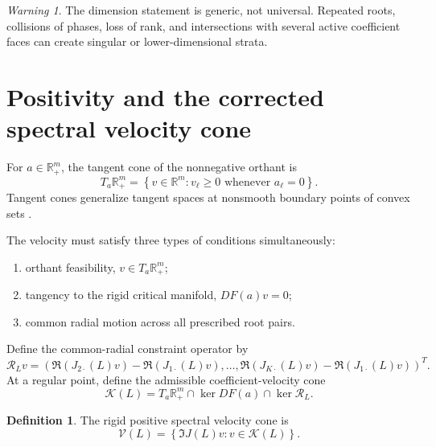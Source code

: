 \documentclass[11pt]{amsart}
\numberwithin{equation}{section}
\theoremstyle{plain}
\theoremstyle{definition}
\newtheorem{definition}[theorem]{Definition}
\theoremstyle{remark}
\newtheorem{warning}[theorem]{Warning}
\begin{document}
\begin{warning}
\label{warn:singular_manifold}
The dimension statement is generic, not universal.  Repeated roots, collisions of phases, loss of rank, and intersections with several active coefficient faces can create singular or lower-dimensional strata.
\end{warning}

\section{Positivity and the corrected spectral velocity cone}
\label{sec:velocity_cone}

For $a\in\mathbb R_+^m$, the tangent cone of the nonnegative orthant is
\begin{equation}
T_a\mathbb R_+^m
=
\left\{
v\in\mathbb R^m:
 v_\ell\geq0\text{ whenever }a_\ell=0
\right\}.
\label{eq:orthant_tangent_cone}
\end{equation}
Tangent cones generalize tangent spaces at nonsmooth boundary points of convex sets \cite{Wright2019}.

The velocity must satisfy three types of conditions simultaneously:
\begin{enumerate}
\item orthant feasibility, $v\in T_a\mathbb R_+^m$;
\item tangency to the rigid critical manifold, $DF(a)v=0$;
\item common radial motion across all prescribed root pairs.
\end{enumerate}

Define the common-radial constraint operator by
\begin{equation}
\mathcal R_Lv
=
\left(
\Re(J_{2\cdot}(L)v)-\Re(J_{1\cdot}(L)v),
\ldots,
\Re(J_{K\cdot}(L)v)-\Re(J_{1\cdot}(L)v)
\right)^T.
\label{eq:common_radial_operator}
\end{equation}
At a regular point, define the admissible coefficient-velocity cone
\begin{equation}
\mathcal K(L)
=
T_a\mathbb R_+^m
\cap\ker DF(a)
\cap\ker\mathcal R_L.
\label{eq:admissible_coefficient_cone}
\end{equation}

\begin{definition}
\label{def:spectral_velocity_cone}
The rigid positive spectral velocity cone is
\begin{equation}
\mathcal V(L)
=
\left\{
\Im J(L)v:
 v\in\mathcal K(L)
\right\}.
\label{eq:spectral_velocity_cone}
\end{equation}
\end{definition}
\end{document}
